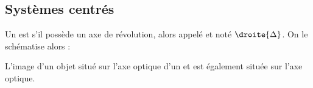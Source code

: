 \subsection{Systèmes centrés}

\begin{definition}
Un  est  s'il possède un axe de révolution, alors appelé  et noté $\droite{\Delta}$. On le schématise alors :

\begin{figure}[H]
\begin{center}
\end{center}
\end{figure}
\end{definition}

\begin{propriete}
L'image d'un objet situé sur l'axe optique d'un  et  est également située sur l'axe optique.
\end{propriete}

